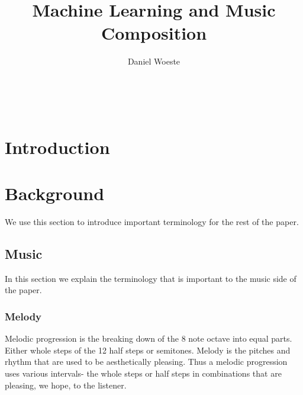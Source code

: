 \documentclass{sig-alternate}
\begin{document}

\title{Machine Learning and Music Composition}
\author{
\alignauthor
Daniel Woeste\\
	\\
	\\
	\\
}


\maketitle
\begin{abstract}

\end{abstract}

\section{Introduction}
\label{sec:introduction}

\section{Background}
\label{sec:background}
	We use this section to introduce important terminology for the rest of the paper.

\subsection{Music}
\label{sec:music}
	In this section we explain the terminology that is important to the music side of the paper.
\subsubsection{Melody}
\label{sec:melody}
Melodic progression is the breaking down of the 8 note octave into equal parts. Either whole steps of the 12 half steps or semitones.
Melody is the pitches and rhythm that are used to be aesthetically pleasing.
Thus a melodic progression uses various intervals- the whole steps or half steps in combinations that are pleasing, we hope, to the listener.
\end{document}
